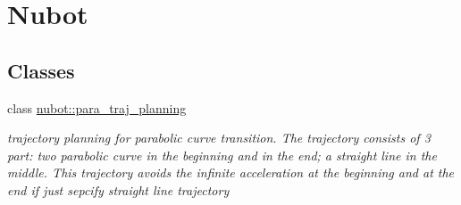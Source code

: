 \hypertarget{group__nubot}{\section{Nubot}
\label{group__nubot}
}
\subsection*{Classes}
\begin{DoxyCompactItemize}
\item 
class \hyperlink{classnubot_1_1para__traj__planning}{nubot\-::para\-\_\-traj\-\_\-planning}
\begin{DoxyCompactList}\small\item\em trajectory planning for parabolic curve transition. The trajectory consists of 3 part\-: two parabolic curve in the beginning and in the end; a straight line in the middle. This trajectory avoids the infinite acceleration at the beginning and at the end if just sepcify straight line trajectory \end{DoxyCompactList}\end{DoxyCompactItemize}
